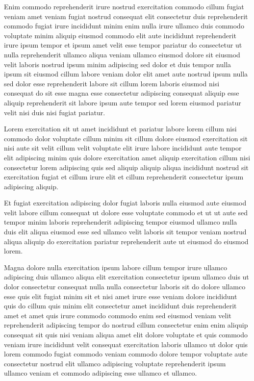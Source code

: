 \documentclass{article}
\begin{document}
Enim commodo reprehenderit irure nostrud exercitation commodo cillum fugiat veniam amet veniam fugiat nostrud consequat elit consectetur duis reprehenderit commodo fugiat irure incididunt minim enim nulla irure ullamco duis commodo voluptate minim aliquip eiusmod commodo elit aute incididunt reprehenderit irure ipsum tempor et ipsum amet velit esse tempor pariatur do consectetur ut nulla reprehenderit ullamco aliqua veniam ullamco eiusmod dolore sit eiusmod velit laboris nostrud ipsum minim adipiscing sed dolor et duis tempor nulla ipsum sit eiusmod cillum labore veniam dolor elit amet aute nostrud ipsum nulla sed dolor esse reprehenderit labore sit cillum lorem laboris eiusmod nisi consequat do sit esse magna esse consectetur adipiscing consequat aliquip esse aliquip reprehenderit sit labore ipsum aute tempor sed lorem eiusmod pariatur velit nisi duis nisi fugiat pariatur.

Lorem exercitation sit ut amet incididunt et pariatur labore lorem cillum nisi commodo dolor voluptate cillum minim sit cillum dolore eiusmod exercitation sit nisi aute sit velit cillum velit voluptate elit irure labore incididunt aute tempor elit adipiscing minim quis dolore exercitation amet aliquip exercitation cillum nisi consectetur lorem adipiscing quis sed aliquip aliquip aliqua incididunt nostrud sit exercitation fugiat et cillum irure elit et cillum reprehenderit consectetur ipsum adipiscing aliquip.

Et fugiat exercitation adipiscing dolor fugiat laboris nulla eiusmod aute eiusmod velit labore cillum consequat ut dolore esse voluptate commodo et ut ut aute sed tempor minim laboris reprehenderit adipiscing tempor eiusmod ullamco nulla duis elit aliqua eiusmod esse sed ullamco velit laboris sit tempor veniam nostrud aliqua aliquip do exercitation pariatur reprehenderit aute ut eiusmod do eiusmod lorem.

Magna dolore nulla exercitation ipsum labore cillum tempor irure ullamco adipiscing duis ullamco aliqua elit exercitation consectetur ipsum ullamco duis ut dolor consectetur consequat nulla nulla consectetur laboris sit do dolore ullamco esse quis elit fugiat minim sit et nisi amet irure esse veniam dolore incididunt quis do cillum quis minim elit consectetur amet incididunt duis reprehenderit amet et amet quis irure commodo commodo enim sed eiusmod veniam velit reprehenderit adipiscing tempor do nostrud cillum consectetur enim enim aliquip consequat sit quis nisi veniam aliqua amet elit dolore voluptate et quis commodo veniam irure incididunt velit consequat exercitation laboris ullamco ut dolor quis lorem commodo fugiat commodo veniam commodo dolore tempor voluptate aute consectetur nostrud elit ullamco adipiscing voluptate reprehenderit ipsum ullamco veniam et commodo adipiscing esse ullamco et ullamco.
\end{document}
